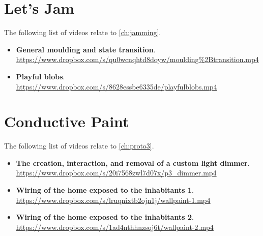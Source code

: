 \section{Let's Jam}
\label{app:videos:jamming}

The following list of videos relate to \autoref{ch:jamming}.

\begin{itemize}
	\item{\textbf{General moulding and state transition}. \\
		\url{https://www.dropbox.com/s/qu0wcnqhtd8doyw/moulding%2Btransition.mp4}} 
	\item{\textbf{Playful blobs}. \\
		\url{https://www.dropbox.com/s/8628essbe6335de/playfulblobs.mp4}} 
\end{itemize}

\section{Conductive Paint}
\label{app:videos:cpaint}

The following list of videos relate to \autoref{ch:proto3}.

\begin{itemize}
	\item{\textbf{The creation, interaction, and removal of a custom light dimmer}. \\
		\url{https://www.dropbox.com/s/20i7568zwl7d07x/p3_dimmer.mp4}}
	\item{\textbf{Wiring of the home exposed to the inhabitants 1}. \\
		\url{https://www.dropbox.com/s/lruqnixtb2ojn1j/wallpaint-1.mp4}}
	\item{\textbf{Wiring of the home exposed to the inhabitants 2}. \\
		\url{https://www.dropbox.com/s/1ad4nthhnzsqj6t/wallpaint-2.mp4}}
\end{itemize}